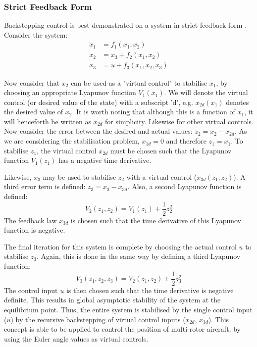 \subsubsection{Strict Feedback Form}
Backstepping control is best demonstrated on a system in strict feedback form \cite{1992a}. Consider the system:
\begin{equation*}
\begin{split}
\dot{x}_{1}&=f_{1}(x_{1},x_{2})\\
\dot{x}_{2}&=x_{3}+f_{2}(x_{1},x_{2})\\
\dot{x}_{3}&=u +f_{3}(x_{1},x_{2}, x_{3})
\end{split}
\end{equation*}

Now consider that $x_{2}$ can be used as a "virtual control" to stabilise $\dot{x}_{1}$, by choosing an appropriate Lyapunov function $V_{1}(x_{1})$. We will denote the virtual control (or desired value of the state) with a subscript 'd', e.g. $x_{2d}(x_{1})$ denotes the desired value of $x_{2}$. It is worth noting that although this is a function of $x_{1}$, it will henceforth be written as $x_{2d}$ for simplicity. Likewise for other virtual controls.  Now consider the error between the desired and actual values: $z_{2}=x_{2}-x_{2d}$. As we are considering the stabilisation problem, $x_{1d}=0$ and therefore $z_{1}=x_{1}$. To stabilise $z_{1}$, the virtual control $x_{2d}$ must be chosen such that the Lyapunov function $V_{1}(z_{1})$ has a negative time derivative.

Likewise, $x_{3}$ may be used to stabilise $z_{2}$ with a virtual control ($x_{3d}(z_{1},z_{2})$). A third error term is defined: $z_{3}=x_{3}-x_{3d}$. Also, a second Lyapunov function is defined: 
\begin{equation*}
V_{2}(z_{1},z_{2})=V_{1}(z_{1})+\frac{1}{2}z_{2}^{2}
\end{equation*}
The feedback law $x_{3d}$ is chosen such that the time derivative of this Lyapunov function is negative. 

The final iteration for this system is complete by choosing the actual control $u$ to stabilise $z_{3}$. Again, this is done in the same way by defining a third Lyapunov function:
\begin{equation*}
V_{3}(z_{1},z_{2},z_{3})=V_{2}(z_{1},z_{2})+\frac{1}{2}z_{3}^{2}
\end{equation*}
The control input $u$ is then chosen such that the time derivative is negative definite. This results in global asymptotic stability of the system at the equilibrium point. Thus, the entire system is stabilised by the single control input ($u$) by the recursive backstepping of virtual control inputs ($x_{2d}$, $x_{3d}$). This concept is able to be applied to control the position of multi-rotor aircraft, by using the Euler angle values as virtual controls.


